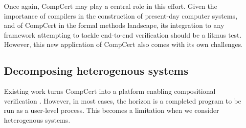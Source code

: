 \documentclass[acmsmall,authordraft]{acmart}
\begin{document}

Once again,
CompCert may play a central role in this effort.
Given the importance of compilers in
the construction of present-day computer systems,
and of CompCert in the formal methods landscape,
its integration to any framework
attempting to tackle end-to-end verification
should be a litmus test.
However, this new application of CompCert also
comes with its own challenges.

\subsection{Decomposing heterogenous systems}

Existing work turns CompCert
into a platform enabling compositional verification
\cite{compcompcert,sepcompcert,compcertm,vst,verasco}.
However, in most cases,
the horizon is a completed program to be run as a user-level process.
This becomes a limitation when we consider heterogenous systems.
\end{document}
